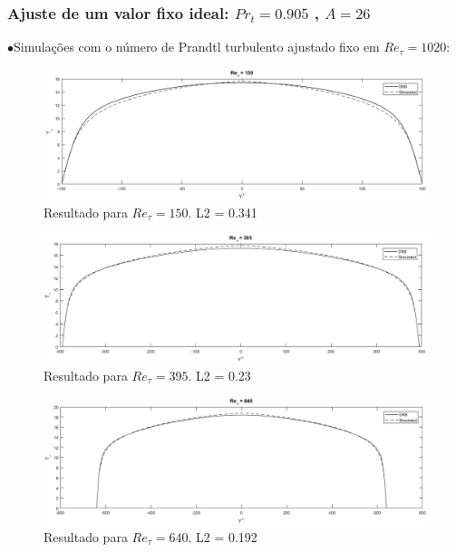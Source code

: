\documentclass[xcolor=dvipsnames,10pt,aspectratio=169]{beamer}
\begin{document}
		\begin{frame}
		\frametitle{Ajuste de um valor fixo ideal: $Pr_t = 0.905$ , $A = 26$}
		$\bullet$Simulações com o número de Prandtl turbulento ajustado fixo em $Re_\tau = 1020$:  \\
		\begin{minipage}[h!]{0.45\textwidth}
			 \begin{figure}
			 	\centering
			 	\includegraphics[angle=0, scale=0.22]{150segundo}
			 	\caption{Resultado para $Re_\tau = 150$. L2 = 0.341}
			 \end{figure}
			 \begin{figure}
			 	\centering
			 	\includegraphics[angle=0, scale=0.22]{395segundo}
			 	\caption{Resultado para $Re_\tau = 395$. L2 = 0.23}
			 \end{figure}
		\end{minipage}\hfill
		\begin{minipage}[h!]{0.45\textwidth}
			\begin{figure}
				\centering
				\includegraphics[angle=0, scale=0.22]{640segundo}
				\caption{Resultado para $Re_\tau = 640$. L2 = 0.192}
			\end{figure}
			\begin{figure}

\end{figure}
\end{minipage}
\end{frame}
\end{document}
